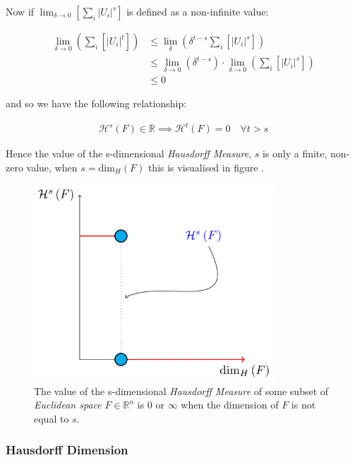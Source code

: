 \documentclass[11pt]{article}
\begin{document}
Now if \(\lim_{\delta \rightarrow 0}\left[ \sum_{i}   \left\lvert U_i \right\rvert^s \right]\) is defined as a non-infinite value:

\begin{align}
    \lim_{\delta \rightarrow 0} \left( \sum_{i}   \left[ \left\lvert U_i \right\rvert^t \right]  \right) & \leq \lim_{\delta}\left( \delta^{t- s} \sum_{i}   \left[ \left\lvert U_i \right\rvert^s \right]  \right) \\
&\leq \lim_{\delta \rightarrow 0}\left( \delta^{t - s} \right) \cdot  \lim_{\delta \rightarrow 0}\left( \sum_{i} \left[ \left\lvert U_i \right\rvert^s \right]    \right) \\
&\leq 0
\end{align}

and so we have the following relationship:

\begin{align}
    \mathcal{H}^{s} \left(F\right) \in \mathbb{R}  \implies  \mathcal{H}^t\left( F \right)= 0 \quad \forall t > s \label{eq:hdfzero}
\end{align}

Hence the value of the s-dimensional \emph{Hausdorff Measure}, \(s\) is only a finite, non-zero value, when \(s = \mathrm{dim}_{H}\left( F \right)\) this is visualised in figure .



\begin{figure}[htbp]
\centering
\includegraphics[width=9cm]{media/tikz/hausdorff-dimension-plot.png}
\caption{\label{hausdorff-vals}The value of the s-dimensional \emph{Hausdorff Measure} of some subset of \emph{Euclidean space} \(F\in \mathbb{R}^{n}\) is 0 or \(\infty\) when the dimension of \(F\) is not equal to \(s\).}
\end{figure}

\subsubsection{Hausdorff Dimension}
\label{sec:org25ecc51}
\end{document}
